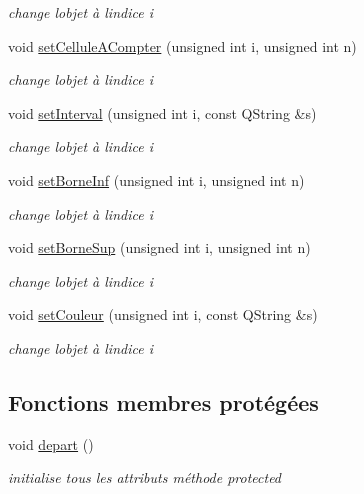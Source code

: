 \begin{DoxyCompactItemize}
\begin{DoxyCompactList}\small\item\em change l\textquotesingle{}objet à l\textquotesingle{}indice i \end{DoxyCompactList}\item 
void \hyperlink{class_regle2_d_af12aeb43af9b84670923ef55c5c1daf6}{set\+Cellule\+A\+Compter} (unsigned int i, unsigned int n)
\begin{DoxyCompactList}\small\item\em change l\textquotesingle{}objet à l\textquotesingle{}indice i \end{DoxyCompactList}\item 
void \hyperlink{class_regle2_d_a67d7b3803a63f2bb1b2b3073e01334ba}{set\+Interval} (unsigned int i, const Q\+String \&s)
\begin{DoxyCompactList}\small\item\em change l\textquotesingle{}objet à l\textquotesingle{}indice i \end{DoxyCompactList}\item 
void \hyperlink{class_regle2_d_aa547b53ccd967ba81e1eb899517713c7}{set\+Borne\+Inf} (unsigned int i, unsigned int n)
\begin{DoxyCompactList}\small\item\em change l\textquotesingle{}objet à l\textquotesingle{}indice i \end{DoxyCompactList}\item 
void \hyperlink{class_regle2_d_a65e642a8babbaf2f9ab92c105b44753c}{set\+Borne\+Sup} (unsigned int i, unsigned int n)
\begin{DoxyCompactList}\small\item\em change l\textquotesingle{}objet à l\textquotesingle{}indice i \end{DoxyCompactList}\item 
void \hyperlink{class_regle2_d_a1f45d6182d2e12d25717c8958cdffeac}{set\+Couleur} (unsigned int i, const Q\+String \&s)
\begin{DoxyCompactList}\small\item\em change l\textquotesingle{}objet à l\textquotesingle{}indice i \end{DoxyCompactList}\end{DoxyCompactItemize}
\subsection*{Fonctions membres protégées}
\begin{DoxyCompactItemize}
\item 
void \hyperlink{class_regle2_d_a89d141ceb6bca904b32c4b31a824538d}{depart} ()
\begin{DoxyCompactList}\small\item\em initialise tous les attributs méthode protected \end{DoxyCompactList}\end{DoxyCompactItemize}
